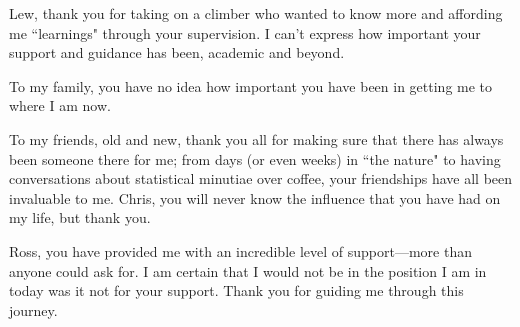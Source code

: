 Lew, thank you for taking on a climber who wanted to know more and affording me ``learnings" through your supervision. I can't express how important your support and guidance has been, academic and beyond.

To my family, you have no idea how important you have been in getting me to where I am now. 

To my friends, old and new, thank you all for making sure that there has always been someone there for me; from days (or even weeks) in ``the nature" to having conversations about statistical minutiae over coffee, your friendships have all been invaluable to me. Chris, you will never know the influence that you have had on my life, but thank you.

Ross, you have provided me with an incredible level of support---more than anyone could ask for. I am certain that I would not be in the position I am in today was it not for your support. Thank you for guiding me through this journey.

